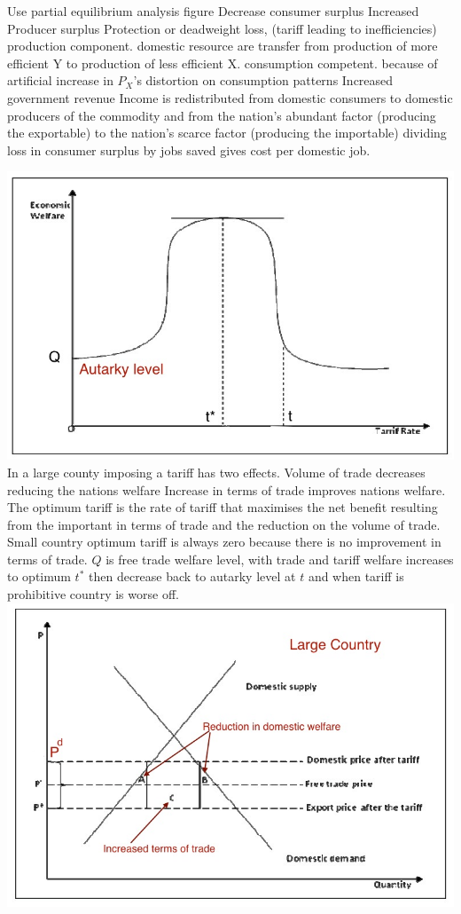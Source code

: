 \documentclass[12pt]{examnotes}
\begin{document}
\ra Use partial equilibrium analysis figure
\ra Decrease consumer surplus
\ra Increased Producer surplus
\ra Protection or deadweight loss, (tariff leading to inefficiencies)
 production component. domestic resource are transfer from production of more efficient Y to production of less efficient X.
  consumption competent. because of artificial increase in $P_X$'s distortion on consumption patterns
\ra Increased government revenue
\ra Income is redistributed from domestic consumers to domestic producers of the commodity and from the nation's abundant factor (producing the exportable) to the nation's scarce factor (producing the importable)
\ra dividing loss in consumer surplus by jobs saved gives cost per domestic job.

\includegraphics[scale=0.4]{./imgs/532.jpg}
\ra In a large county imposing a tariff has two effects.
 Volume of trade decreases reducing the nations welfare
 Increase in terms of trade improves nations welfare.
\ra The optimum tariff is the rate of tariff that maximises the net benefit resulting from the important in terms of trade and the reduction on the volume of trade.
\ra Small country optimum tariff is always zero because there is no improvement in terms of trade.
\ra $Q$ is free trade welfare level, with trade and tariff welfare increases to optimum $t^*$ then decrease back to autarky level at $t$ and when tariff is prohibitive country is worse off.
\includegraphics[scale=0.35]{./imgs/531.jpg}
\end{document}
